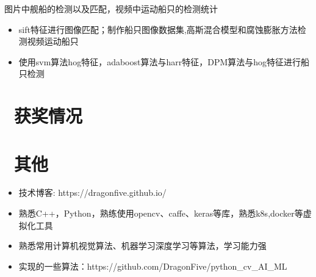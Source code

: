 \documentclass{resume}
\begin{document}
图片中舰船的检测以及匹配，视频中运动船只的检测统计
\begin{itemize}
  \item sift特征进行图像匹配；制作船只图像数据集,高斯混合模型和腐蚀膨胀方法检测视频运动船只
  \item 使用svm算法hog特征，adaboost算法与harr特征，DPM算法与hog特征进行船只检测
\end{itemize}




\section{\faHeartO\ 获奖情况}

\section{\faInfo\ 其他}
\begin{itemize}[parsep=0.5ex]
  \item 技术博客: https://dragonfive.github.io/
  \item 熟悉C++，Python，熟练使用opencv、caffe、keras等库，熟悉k8s,docker等虚拟化工具
  \item 熟悉常用计算机视觉算法、机器学习深度学习等算法，学习能力强
  \item 实现的一些算法：https://github.com/DragonFive/python\_cv\_AI\_ML
\end{itemize}

%
%
\end{document}
